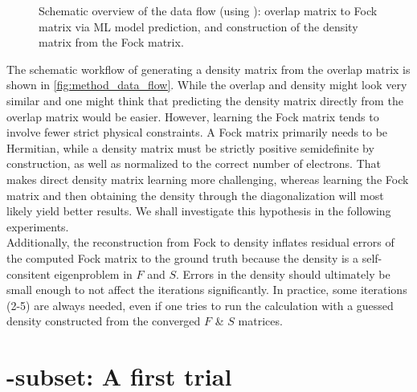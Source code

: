 \begin{figure}[H]
    \caption[Schematic overview data flow]{Schematic overview of the data flow (using ): overlap matrix to Fock matrix via ML model prediction, and construction of the density matrix from the Fock matrix.}
    \label{fig:method_data_flow}
\end{figure}

The schematic workflow of generating a density matrix from the overlap matrix is shown in \autoref{fig:method_data_flow}. While the overlap and density might look very similar and one might think that predicting the density matrix directly from the overlap matrix would be easier. However, learning the Fock matrix tends to involve fewer strict physical constraints. A Fock matrix primarily needs to be Hermitian, while a density matrix must be strictly positive semidefinite by construction, as well as normalized to the correct number of electrons. That makes direct density matrix learning more challenging, whereas learning the Fock matrix and then obtaining the density through the diagonalization will most likely yield better results. We shall investigate this hypothesis in the following experiments.\\

Additionally, the reconstruction from Fock to density inflates residual errors of the computed Fock matrix to the ground truth because the density is a self-consitent eigenproblem in $F$ and $S$. Errors in the density should ultimately be small enough to not affect the iterations significantly. In practice, some iterations (2-5) are always needed, even if one tries to run the calculation with a guessed density constructed from the converged $F$ \& $S$ matrices.\\

\section{-subset: A first trial}
\label{sec:qm9_c5h4n2o2}

